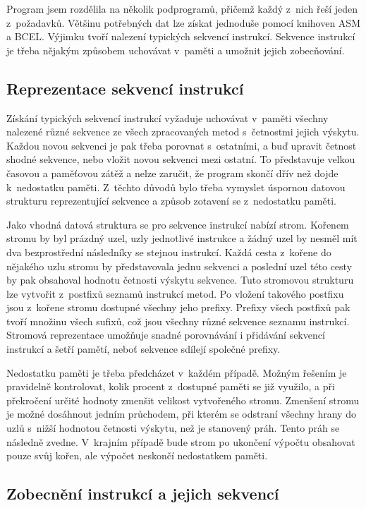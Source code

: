Program jsem rozdělila na několik podprogramů, přičemž každý z~nich řeší jeden z~požadavků. 
Většinu potřebných dat lze získat jednoduše pomocí knihoven ASM a BCEL. Výjimku tvoří nalezení typických sekvencí instrukcí. Sekvence instrukcí je třeba nějakým způsobem uchovávat v~paměti a umožnit jejich zobecňování.

\subsection{Reprezentace sekvencí instrukcí}

Získání typických sekvencí instrukcí vyžaduje uchovávat v~paměti všechny nalezené různé sekvence ze všech zpracovaných metod s~četnostmi jejich výskytu. Každou novou sekvenci je pak třeba porovnat s~ostatními, a buď upravit četnost shodné sekvence, nebo vložit novou sekvenci mezi ostatní. To představuje velkou časovou a paměťovou zátěž a nelze zaručit, že program skončí dřív než dojde k~nedostatku paměti. Z~těchto důvodů bylo třeba vymyslet úspornou datovou strukturu reprezentující sekvence a způsob zotavení se z~nedostatku paměti.

Jako vhodná datová struktura se pro sekvence instrukcí nabízí strom. Kořenem stromu by byl prázdný uzel, uzly jednotlivé instrukce a žádný uzel by nesměl mít dva bezprostřední následníky se stejnou instrukcí. Každá cesta z~kořene do nějakého uzlu stromu by představovala jednu sekvenci a poslední uzel této cesty by pak obsahoval hodnotu četnosti výskytu sekvence. Tuto stromovou strukturu lze vytvořit z~postfixů seznamů instrukcí metod. 
Po vložení takového postfixu jsou z~kořene stromu dostupné všechny jeho prefixy. Prefixy všech postfixů pak tvoří množinu všech sufixů, což jsou všechny různé sekvence seznamu instrukcí.
Stromová reprezentace umožňuje snadné porovnávání i přidávání sekvencí instrukcí a šetří pamětí, neboť sekvence sdílejí společné prefixy.

Nedostatku paměti je třeba předcházet v~každém případě. Možným řešením je pravidelně kontrolovat, kolik procent z~dostupné paměti se již využilo, a při překročení určité hodnoty zmenšit velikost vytvořeného stromu. Zmenšení stromu je možné dosáhnout jedním průchodem, při kterém se odstraní všechny hrany do uzlů s~nižší hodnotou četnosti výskytu, než je stanovený práh. Tento práh se následně zvedne. V~krajním případě bude strom po ukončení výpočtu obsahovat pouze svůj kořen, ale výpočet neskončí nedostatkem paměti.

\subsection{Zobecnění instrukcí a jejich sekvencí}

